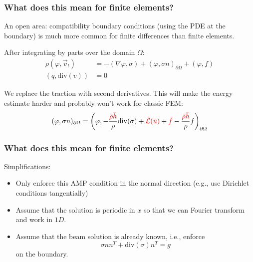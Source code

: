 \documentclass[8pt]{beamer}
\newcommand{\leftd}[1]{{\color{red} \bar{#1}}}
\newcommand{\leftdd}[2]{{\color{red} \bar{#1}(\bar{#2})}}
\newcommand{\divergence}{\mathrm{div}}
\begin{document}
\begin{frame}
    \frametitle{What does this mean for finite elements?}
    An open area: compatibility boundary conditions (using the PDE at the
    boundary) is much more common for finite differences than finite elements.

    \pause
    \vspace{0.5in}
    After integrating by parts over the domain \(\Omega\):
    \begin{align}
        \rho (\varphi, \vec{v}_t) &= -(\nabla \varphi, \sigma)
        + (\varphi, \sigma n)_{\partial \Omega}
        + (\varphi, f)                                                        \\
        (q, \divergence(v)) &= 0
    \end{align}

    We replace the traction with second derivatives. This will make the
    energy estimate harder and probably won't work for classic FEM:
    \begin{equation}
        (\varphi, \sigma n)_{\partial \Omega} = \left(\varphi,
        - \dfrac{\leftd{\rho} \leftd{h}}{\rho} \divergence(\sigma)
        + \leftdd{\mathcal{L}}{u}
        + \leftd{f}
        - \dfrac{\leftd{\rho} \leftd{h}}{\rho} f\right)_{\partial \Omega}
    \end{equation}
\end{frame}

\begin{frame}
    \frametitle{What does this mean for finite elements?}
    Simplifications:
    \begin{itemize}
        \item Only enforce this AMP condition in the normal direction (e.g., use
              Dirichlet conditions tangentially)
        \item Assume that the solution is periodic in \(x\) so that we can
              Fourier transform and work in \(1D\).
        \item Assume that the beam solution is already known, i.e., enforce
              \begin{equation}
                  \sigma n n^T + \divergence(\sigma) n^T = g
              \end{equation}
              on the boundary.
    \end{itemize}
\end{frame}
\end{document}
